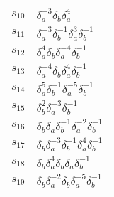 \documentclass{article}
\begin{document}
\begin{center}
\begin{tabular}{ll}
$s_{10}$ & $\delta_a^{-3}\delta_b^{}\delta_a^{4}$ \\
$s_{11}$ & $\delta_a^{-3}\delta_b^{-1}\delta_a^{3}\delta_b^{-1}$ \\
$s_{12}$ & $\delta_a^{4}\delta_b^{}\delta_a^{-4}\delta_b^{-1}$ \\
$s_{13}$ & $\delta_a^{-4}\delta_b^{}\delta_a^{4}\delta_b^{-1}$ \\
$s_{14}$ & $\delta_a^{5}\delta_b^{-1}\delta_a^{-5}\delta_b^{-1}$ \\
$s_{15}$ & $\delta_b^{2}\delta_a^{-3}\delta_b^{-1}$ \\
$s_{16}$ & $\delta_b^{}\delta_a^{}\delta_b^{-1}\delta_a^{-2}\delta_b^{-1}$ \\
$s_{17}$ & $\delta_b^{}\delta_a^{-3}\delta_b^{-1}\delta_a^{4}\delta_b^{-1}$ \\
$s_{18}$ & $\delta_b^{}\delta_a^{4}\delta_b^{}\delta_a^{}\delta_b^{-1}$ \\
$s_{19}$ & $\delta_b^{}\delta_a^{-2}\delta_b^{}\delta_a^{-5}\delta_b^{-1}$ \\
\bottomrule
\end{tabular}
\end{center}

\thispagestyle{empty}
\end{document}
